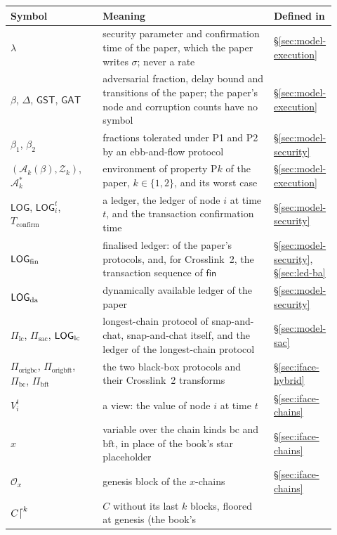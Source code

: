\documentclass[11pt,a4paper]{article}
\theoremstyle{definition}
\newcommand{\Adv}{\mathcal{A}}
\newcommand{\bc}{\mathrm{bc}}
\newcommand{\bft}{\mathrm{bft}}
\newcommand{\Origin}{\mathcal{O}}
\newcommand{\Piorigbc}{\Pi_{\mathrm{origbc}}}
\newcommand{\Piorigbft}{\Pi_{\mathrm{origbft}}}
\newcommand{\Pibc}{\Pi_{\bc}}
\newcommand{\Pibft}{\Pi_{\bft}}
\newcommand{\Pilc}{\Pi_{\mathrm{lc}}}
\newcommand{\Pisac}{\Pi_{\mathrm{sac}}}
\newcommand{\LOG}{\mathsf{LOG}}
\newcommand{\GST}{\mathsf{GST}}
\newcommand{\GAT}{\mathsf{GAT}}
\newcommand{\Tconfirm}{T_{\mathrm{confirm}}}
\newcommand{\Env}{\mathcal{Z}}
\newcommand{\fin}{\mathsf{fin}}
\begin{document}
\begin{table}[tbp]
\centering
\footnotesize \renewcommand{\arraystretch}{1.1}
\begin{tabular}{@{}p{0.29\linewidth}p{0.52\linewidth}p{0.11\linewidth}@{}}
\toprule
Symbol & Meaning & Defined in \\
\midrule
$\lambda$
  & security parameter and confirmation time of the paper, which the paper
  writes $\sigma$; never a rate
  & \S\ref{sec:model-execution} \\
$\beta$, $\Delta$, $\GST$, $\GAT$
  & adversarial fraction, delay bound and transitions of the paper; the
  paper's node and corruption counts have no symbol
  & \S\ref{sec:model-execution} \\
$\beta_1$, $\beta_2$
  & fractions tolerated under P1 and P2 by an ebb-and-flow protocol
  & \S\ref{sec:model-security} \\
$(\Adv_k(\beta), \Env_k)$, $\Adv_k^*$
  & environment of property P$k$ of the paper, $k \in \{1, 2\}$, and its
  worst case
  & \S\ref{sec:model-execution} \\
$\LOG$, $\LOG_i^t$, $\Tconfirm$
  & a ledger, the ledger of node $i$ at time $t$, and the transaction
  confirmation time
  & \S\ref{sec:model-security} \\
$\LOGfin$
  & finalised ledger: of the paper's protocols, and, for Crosslink~2, the
  transaction sequence of $\fin$
  & \S\ref{sec:model-security}, \S\ref{sec:led-ba} \\
$\LOGda$
  & dynamically available ledger of the paper
  & \S\ref{sec:model-security} \\
$\Pilc$, $\Pisac$, $\LOGlc$
  & longest-chain protocol of snap-and-chat, snap-and-chat itself, and the
  ledger of the longest-chain protocol
  & \S\ref{sec:model-sac} \\
$\Piorigbc$, $\Piorigbft$, $\Pibc$, $\Pibft$
  & the two black-box protocols and their Crosslink~2 transforms
  & \S\ref{sec:iface-hybrid} \\
$V_i^t$
  & a view: the value of node $i$ at time $t$
  & \S\ref{sec:iface-chains} \\
$x$
  & variable over the chain kinds $\bc$ and $\bft$, in place of the book's
  star placeholder
  & \S\ref{sec:iface-chains} \\
$\Origin_x$
  & genesis block of the $x$-chains
  & \S\ref{sec:iface-chains} \\
$C\trunc{k}$
  & $C$ without its last $k$ blocks, floored at genesis (the book's

\end{tabular}
\end{table}
\end{document}
